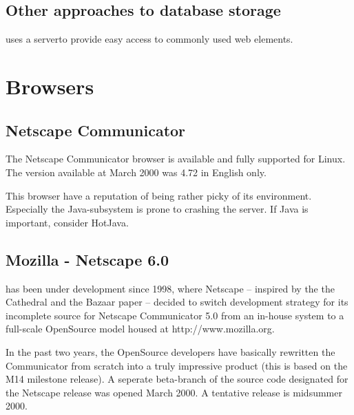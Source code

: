 \subsection{Other approaches to database storage}

 uses a
 serverto provide easy access to commonly
used web elements.


\section{Browsers}


\subsection{Netscape Communicator}
\label{sec:netscape-communicator}

The Netscape Communicator browser is available and fully supported for
Linux.  The version available at March 2000 was 4.72 in English only.

This browser have a reputation of being rather picky of its
environment.  Especially the Java-subsystem is prone to crashing the
server.  If Java is important, consider HotJava.


\subsection{Mozilla - Netscape 6.0}
\label{sec:mozilla}

 has been under
development since 1998, where Netscape -- inspired by the \textsf{the
Cathedral and the Bazaar} paper -- decided to switch development
strategy for its incomplete source for Netscape Communicator 5.0 from
an in-house system to a full-scale OpenSource model housed at
http://www.mozilla.org.

In the past two years, the OpenSource developers have basically
rewritten the Communicator from scratch into a truly impressive
product (this is based on the M14 milestone release).  A seperate
beta-branch of the source code designated for the Netscape release was
opened March 2000. A tentative release is midsummer 2000.


